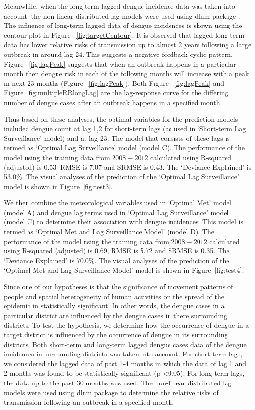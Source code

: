 \documentclass{bmcart}
\begin{document}
Meanwhile, when the long-term lagged dengue incidence data was taken into account, the non-linear distributed lag models were used using dlnm package \cite{gasparrini2011distributed}. The influence of long-term lagged data of dengue incidences is shown using the contour plot in Figure ~\ref{fig:targetContour}. It is observed that lagged long-term data has lower relative risks of transmission up to almost 2 years following a large outbreak in around lag 24. This suggests a negative feedback cyclic pattern. Figure ~\ref{fig:lagPeak} suggests that when an outbreak happens in a particular month then dengue risk in each of the following months will increase with a peak in next 23 months (Figure ~\ref{fig:lagPeak}).  Both Figure ~\ref{fig:lagPeak} and Figure~\ref{fig:multipleRRlongLag} are the lag-response curve for the differing number of dengue cases after an outbreak happens in a specified month. 


Thus based on these  analyses, the optimal variables for the prediction models included dengue count at lag 1,2 for short-term lags (as used in `Short-term Lag Surveillance' model) and at lag 23. The model that consists of these lags is termed as `Optimal Lag Surveillance' model (model C). The performance of the model using the training data from $2008-2012$ calculated using R-squared (adjusted) is 0.53, RMSE is 7.07 and SRMSE is 0.43. The `Deviance Explained' is 53.0\%. The visual analyses of the prediction of the `Optimal Lag Surveillance' model is shown in Figure~\ref{fig:test3}. 


We then combine the meteorological variables used in `Optimal Met' model (model A) and dengue lag terms used in  `Optimal Lag Surveillance' model (model C) to determine their association with dengue incidences. This model is termed as `Optimal Met and Lag Surveillance Model' (model D). The performance of the model using the training data from $2008-2012$ calculated using R-squared (adjusted) is 0.69, RMSE is 5.72 and SRMSE is 0.35. The `Deviance Explained' is 70.0\%. The visual analyses of the prediction of the `Optimal Met and Lag Surveillance Model' model is shown in Figure~\ref{fig:test4}. 

Since one of our hypotheses is that the significance of movement patterns of people and spatial heterogeneity of human activities on the spread of the epidemic in statistically significant. In other words, the dengue cases in a particular district are influenced by the dengue cases in there surrounding districts. To test the hypothesis, we determine how the occurrence of dengue in a target district is influenced by the occurrence of dengue in its surrounding districts. Both short-term and long-term lagged dengue cases data of the dengue incidences in surrounding districts was taken into account. For short-term lags, we considered the lagged data of past 1-4 months in which the data of lag 1 and 2 months was found to be statistically significant (p \textless 0.05). For long-term lags, the data up to the past 30 months was used. The non-linear distributed lag models were used using dlnm package \cite{gasparrini2011distributed} to determine the relative risks of transmission following an outbreak in a specified month. 
\end{document}
